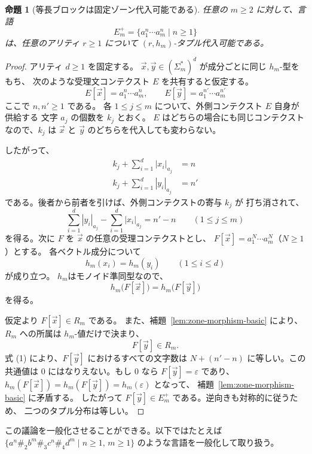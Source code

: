 \documentclass[11pt,a4paper]{ltjsarticle}
\newtheorem{proposition}[theorem]{命題}
\theoremstyle{remark}
\newcommand{\tuple}[1]{\vec{#1}}
\newcommand{\eps}{\varepsilon}
\begin{document}
\begin{proposition}[等長ブロックは固定ゾーン代入可能である]
\label{prop:equality-block-substitutable}
任意の \(m\ge2\) に対して、言語
\[
  E_m^+=\{a_1^n\cdots a_m^n\mid n\ge1\}
\]
は、任意のアリティ \(r\ge1\) について \((r,h_m)\)-タプル代入可能である。
\end{proposition}

\begin{proof}
アリティ \(d\ge1\) を固定する。
\(\tuple x,\tuple y\in(\Sigma_m^*)^d\) が成分ごとに同じ \(h_m\)-型をもち、
次のような受理文コンテクスト \(E\) を共有すると仮定する。
\[
  E[\tuple x]=a_1^n\cdots a_m^n,
  \qquad
  E[\tuple y]=a_1^{n'}\cdots a_m^{n'}
\]
ここで \(n,n'\ge1\) である。
各 \(1\le j\le m\) について、外側コンテクスト \(E\) 自身が供給する
文字 \(a_j\) の個数を \(k_j\) とおく。
\(E\) はどちらの場合にも同じコンテクストなので、\(k_j\) は
\(\tuple x\) と \(\tuple y\) のどちらを代入しても変わらない。

したがって、
\begin{align*}
k_j+\sum_{i=1}^{d}|x_i|_{a_j}&=n\\
k_j+\sum_{i=1}^{d}|y_i|_{a_j}&=n'
\end{align*}
である。後者から前者を引けば、外側コンテクストの寄与 \(k_j\) が
打ち消されて、
\[
  \sum_{i=1}^{d}|y_i|_{a_j}
  -
  \sum_{i=1}^{d}|x_i|_{a_j}
  =n'-n
  \qquad (1\le j\le m)
  \tag{1}
\]
を得る。次に \(F\) を \(\tuple x\) の任意の受理コンテクストとし、
\(F[\tuple x]=a_1^N\cdots a_m^N\)（\(N\ge1\)）とする。
各ベクトル成分について
\[
  h_m(x_i)=h_m(y_i)
  \qquad (1\le i\le d)
\]
が成り立つ。
\(h_m\)はモノイド準同型なので、
\[
  h_m\bigl(F[\tuple x]\bigr)
  =
  h_m\bigl(F[\tuple y]\bigr)
\]
を得る。

仮定より \(F[\tuple x]\in R_m\) である。
また、補題~\ref{lem:zone-morphism-basic} により、
\(R_m\) への所属は \(h_m\)-値だけで決まり、
\[
  F[\tuple y]\in R_m .
\]
式 (1) により、\(F[\tuple y]\) におけるすべての文字数は
\(N+(n'-n)\) に等しい。この共通値は 0 にはなりえない。もし 0 なら
\(F[\tuple y]=\eps\) であり、
\(h_m(F[\tuple x])=h_m(F[\tuple y])=h_m(\eps)\) となって、
補題~\ref{lem:zone-morphism-basic} に矛盾する。
したがって \(F[\tuple y]\in E_m^+\) である。逆向きも対称的に従うため、
二つのタプル分布は等しい。
\end{proof}

この議論を一般化させることができる。以下ではたとえば \(\{a^n\#_2b^m\#_3c^n\#_4d^m\mid n\ge1,\, m\ge1\}\) のような言語を一般化して取り扱う。
\end{document}

